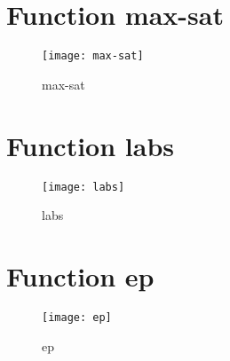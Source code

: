 \newpage

\section{Function max-sat}

\begin{center}

\end{center}

\begin{center}

\end{center}

\begin{figure}[h]
\begin{center}
\texttt{[image: max-sat]}
\caption{max-sat}
\end{center}
\end{figure}

\newpage

\section{Function labs}

\begin{center}

\end{center}

\begin{center}

\end{center}

\begin{figure}[h]
\begin{center}
\texttt{[image: labs]}
\caption{labs}
\end{center}
\end{figure}

\newpage

\section{Function ep}

\begin{center}

\end{center}

\begin{center}

\end{center}

\begin{figure}[h]
\begin{center}
\texttt{[image: ep]}
\caption{ep}
\end{center}
\end{figure}

